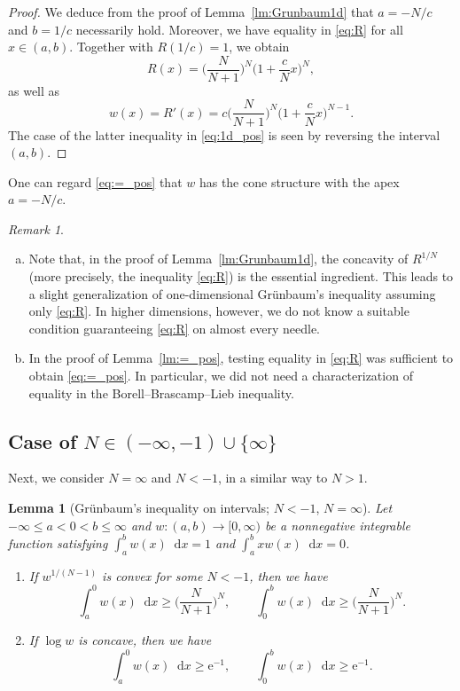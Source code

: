 \documentclass[sts]{imsart}
\newtheorem{lemma}[theorem]{Lemma}
\theoremstyle{definition}
\theoremstyle{remark}
\newtheorem{remark}[theorem]{Remark}
\newcommand{\lra}{\longrightarrow}
\newcommand{\e}{\mathrm{e}}
\newcommand*\diff{\mathop{}\!\mathrm{d}}
\begin{document}
\begin{proof}
We deduce from the proof of Lemma~\ref{lm:Grunbaum1d} that $a=-N/c$ and $b=1/c$ necessarily hold.
Moreover, we have equality in \eqref{eq:R} for all $x \in (a,b)$.
Together with $R(1/c)=1$, we obtain
\[ R(x) =\biggl( \frac{N}{N+1} \biggr)^N \biggl( 1+\frac{c}{N}x \biggr)^N, \]
as well as
\[ w(x) =R'(x) =c \biggl( \frac{N}{N+1} \biggr)^N \biggl( 1+\frac{c}{N}x \biggr)^{N-1}. \]
The case of the latter inequality in \eqref{eq:1d_pos} is seen by reversing the interval $(a,b)$.
\end{proof}

One can regard \eqref{eq:=_pos} that $w$ has the cone structure with the apex $a=-N/c$.

\begin{remark}\label{rm:H}
\begin{enumerate}[(a)]
\item 
Note that, in the proof of Lemma~\ref{lm:Grunbaum1d}, the concavity of $R^{1/N}$ (more precisely, the inequality \eqref{eq:R}) is the essential ingredient.
This leads to a slight generalization of one-dimensional Gr\"unbaum's inequality assuming only \eqref{eq:R}.
In higher dimensions, however, we do not know a suitable condition guaranteeing \eqref{eq:R} on almost every needle.

\item
In the proof of Lemma~\ref{lm:=_pos}, testing equality in \eqref{eq:R} was sufficient to obtain \eqref{eq:=_pos}.
In particular, we did not need a characterization of equality in the Borell--Brascamp--Lieb inequality.
\end{enumerate}
\end{remark}

\subsection{Case of $N \in (-\infty,-1) \cup \{\infty\}$}\label{ssc:1d_neg}%

Next, we consider $N=\infty$ and $N<-1$, in a similar way to $N>1$.

\begin{lemma}[Gr\"unbaum's inequality on intervals; $N<-1$, $N=\infty$]\label{lm:1d_neg}
Let $-\infty \le a<0<b \le \infty$ and $w\colon (a,b) \lra [0,\infty)$ be a nonnegative integrable function satisfying
$\int_a^b w(x)\diff x=1$ and $\int_a^b xw(x)\diff x=0$.
\begin{enumerate}[{\rm (i)}]
\item\label{1d_neg}
If $w^{1/(N-1)}$ is convex for some $N<-1$, then we have
\begin{equation}\label{eq:1d_neg}
\int_a^0 w(x) \diff x \geq \biggl( \frac{N}{N+1} \biggr)^N, \qquad
\int_0^b w(x) \diff x \geq \biggl( \frac{N}{N+1} \biggr)^N.
\end{equation}
\item\label{1d_inf}
If $\log w$ is concave, then we have
\begin{equation}\label{eq:1d_inf}
\int_a^0 w(x) \diff x \geq \e^{-1}, \qquad
\int_0^b w(x) \diff x \geq \e^{-1}.
\end{equation}
\end{enumerate}
\end{lemma}
\end{document}

